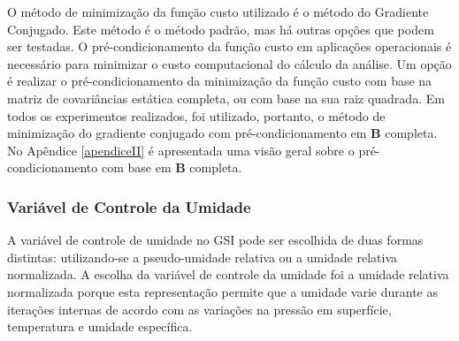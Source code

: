 \begin{figure}[H]
\begin{center}
{        }
    \end{center}
    \vspace{2mm}
   \label{fig:min_fcusto_hsin}
\end{figure}

O método de minimização da função custo utilizado é o método do Gradiente Conjugado. Este método é o método padrão, mas há outras opções que podem ser testadas. O pré-condicionamento da função custo em aplicações operacionais é necessário para minimizar o custo computacional do cálculo da análise. Um opção é realizar o pré-condicionamento da minimização da função custo com base na matriz de covariâncias estática completa, ou com base na sua raiz quadrada. Em todos os experimentos realizados, foi utilizado, portanto, o método de minimização do gradiente conjugado com pré-condicionamento em $\mathbf{B}$ completa. No Apêndice \ref{apendiceII} é apresentada uma visão geral sobre o pré-condicionamento com base em $\mathbf{B}$ completa. 

\subsubsection*{Variável de Controle da Umidade}

A variável de controle de umidade no GSI pode ser escolhida de duas formas distintas: utilizando-se a pseudo-umidade relativa ou a umidade relativa normalizada. A escolha da variável de controle da umidade foi a umidade relativa normalizada porque esta representação permite que a umidade varie durante as iterações internas de acordo com as variações na pressão em superfície, temperatura e umidade específica. %

